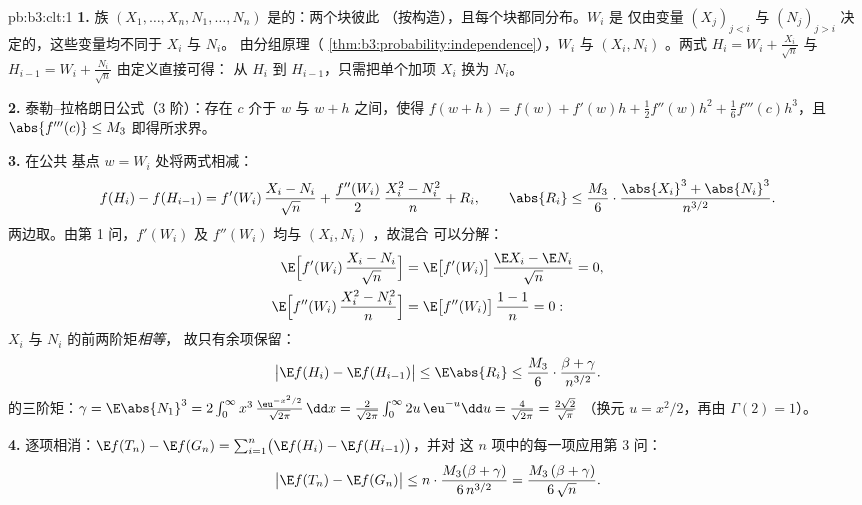 \begin{solution}{pb:b3:clt:1}
\textbf{1.} 族 $(X_1, \dots, X_n, N_1, \dots, N_n)$
是的：两个块彼此
（按构造），且每个块都同分布。$W_i$ 是
仅由变量 $(X_j)_{j<i}$ 与
$(N_j)_{j>i}$ 决定的，这些变量均不同于 $X_i$ 与 $N_i$。
由分组原理（
\cref{thm:b3:probability:independence}），$W_i$
与 $(X_i, N_i)$ 。两式
$H_i = W_i + \frac{X_i}{\sqrt n}$ 与 $H_{i-1} = W_i +
\frac{N_i}{\sqrt n}$ 由定义直接可得：
从 $H_i$ 到 $H_{i-1}$，只需把单个加项
$X_i$ 换为 $N_i$。

\textbf{2.} 泰勒–拉格朗日公式（$3$ 阶）：存在 $c$
介于 $w$ 与 $w + h$ 之间，使得 $f(w + h) = f(w) + f'(w)h +
\frac12f''(w)h^2 + \frac16f'''(c)h^3$，且 $\abs{f'''(c)}
\leq M_3$ 即得所求界。

\textbf{3.} 在公共
基点 $w = W_i$ 处将两式相减：
\[
f(H_i) - f(H_{i-1}) = f'(W_i)\,\frac{X_i - N_i}{\sqrt n} +
\frac{f''(W_i)}{2}\,\frac{X_i^2 - N_i^2}{n} + R_i,
\qquad
\abs{R_i} \leq \frac{M_3}{6}\cdot
\frac{\abs{X_i}^3 + \abs{N_i}^3}{n^{3/2}} .
\]
两边取。由第 1 问，$f'(W_i)$ 及 $f''(W_i)$
均与 $(X_i, N_i)$ ，故混合
可以分解：
\begin{align*}
\E\Bigl[f'(W_i)\,\frac{X_i - N_i}{\sqrt n}\Bigr] &=
\E\bigl[f'(W_i)\bigr]\,\frac{\E X_i - \E N_i}{\sqrt n} = 0,
\\
\E\Bigl[f''(W_i)\,\frac{X_i^2 - N_i^2}{n}\Bigr] &=
\E\bigl[f''(W_i)\bigr]\,\frac{1 - 1}{n} = 0 :
\end{align*}
$X_i$ 与 $N_i$ 的前两阶矩\emph{相等}，
故只有余项保留：
\[
\bigl|\E f(H_i) - \E f(H_{i-1})\bigr| \leq \E\abs{R_i} \leq
\frac{M_3}{6}\cdot\frac{\beta + \gamma}{n^{3/2}} .
\]
的三阶矩：$\gamma = \E\abs{N_1}^3 =
2\int_0^\infty x^3\,\frac{\eu^{-x^2/2}}{\sqrt{2\pi}}\,\dd x
= \frac{2}{\sqrt{2\pi}}\int_0^\infty 2u\,\eu^{-u}\dd u =
\frac{4}{\sqrt{2\pi}} = \frac{2\sqrt2}{\sqrt\pi}$
（换元 $u = x^2/2$，再由 $\Gamma(2) = 1$）。

\textbf{4.} 逐项相消：$\E f(T_n) - \E f(G_n) =
\sum_{i=1}^n\bigl(\E f(H_i) - \E f(H_{i-1})\bigr)$，并对
这 $n$ 项中的每一项应用第 3 问：
\[
\bigl|\E f(T_n) - \E f(G_n)\bigr| \leq
n \cdot \frac{M_3(\beta + \gamma)}{6\,n^{3/2}} =
\frac{M_3\,(\beta + \gamma)}{6\,\sqrt n} .
\]


\end{solution}
